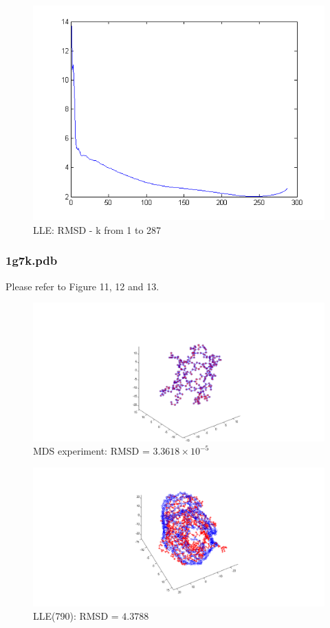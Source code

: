 \documentclass[12pt]{article} %
\begin{document}
\begin{figure}[ht]\centering
	\includegraphics[scale=0.5]{fig3}
	\caption{LLE: RMSD - k from 1 to 287}
\end{figure}

\subsubsection{1g7k.pdb}
Please refer to Figure 11, 12 and 13.

\begin{figure}[ht]\centering
	\includegraphics[width=\linewidth]{fig01}
	\caption{MDS experiment: RMSD = $3.3618 \times 10^{-5}$}
\end{figure}

\begin{figure}[ht]\centering
	\includegraphics[scale=0.2]{fig8}
	\caption{LLE(790): RMSD = $4.3788$}
\end{figure}
\end{document}
